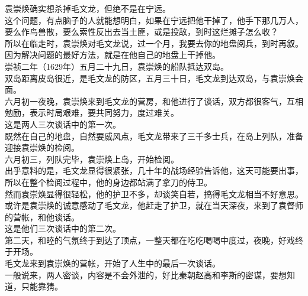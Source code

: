 \begin{multicols}{\theparacolNo}
袁崇焕确实想杀掉毛文龙，但绝不是在宁远。\\

这个问题，有点脑子的人就能想明白，如果在宁远把他干掉了，他手下那几万人，要么作鸟兽散，要么索性反出去当土匪，或是投敌，到时这烂摊子怎么收？\\

所以在临走时，袁崇焕对毛文龙说，过一个月，我要去你的地盘阅兵，到时再叙。\\

因为解决问题的最好方法，就是在他自己的地盘上干掉他。\\

崇祯二年（1629年）五月二十九日，袁崇焕的船队抵达双岛。\\

双岛距离皮岛很近，是毛文龙的防区，五月三十日，毛文龙到达双岛，与袁崇焕会面。\\

六月初一夜晚，袁崇焕来到毛文龙的营房，和他进行了谈话，双方都很客气，互相勉励，表示时局艰难，要共同努力，度过难关。\\

这是两人三次谈话中的第一次。\\

既然在自己的地盘，自然要威风点，毛文龙带来了三千多士兵，在岛上列队，准备迎接袁崇焕的检阅。\\

六月初三，列队完毕，袁崇焕上岛，开始检阅。\\

出乎意料的是，毛文龙显得很紧张，几十年的战场经验告诉他，这天可能要出事，所以在整个检阅过程中，他的身边都站满了拿刀的侍卫。\\

然而袁崇焕显得很轻松，他的护卫不多，却谈笑自若，搞得毛文龙相当不好意思。\\

或许是袁崇焕的诚意感动了毛文龙，他赶走了护卫，就在当天深夜，来到了袁督师的营帐，和他谈话。\\

这是他们三次谈话中的第二次。\\

第二天，和睦的气氛终于到达了顶点，一整天都在吃吃喝喝中度过，夜晚，好戏终于开场。\\

毛文龙来到袁崇焕的营帐，开始了人生中的最后一次谈话。\\

一般说来，两人密谈，内容是不会外泄的，好比秦朝赵高和李斯的密谋，要想知道，只能靠猜。\\


\end{multicols}
